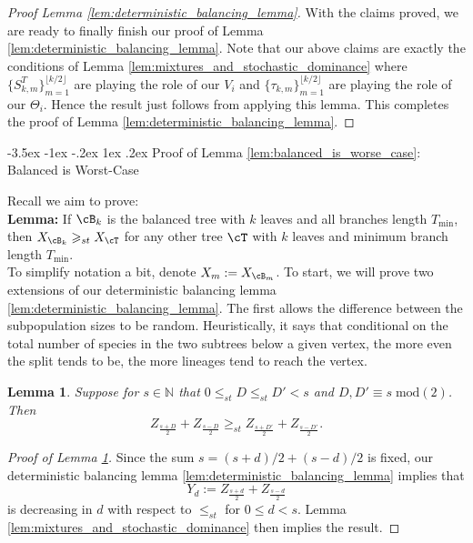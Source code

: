 \documentclass[10pt,oneside,reqno]{article}
\makeatletter
\theoremstyle{plain}
\newtheorem{lemma}[theorem]{Lemma}
\theoremstyle{definition}
\numberwithin{equation}{section}
\def\subsection#1{\@startsection {subsection}{2}{0pt}%
{-3.5ex \@plus -1ex \@minus -.2ex}%
{1ex \@plus.2ex}%
{\bf\mathversion{bold}}{#1}}
\renewcommand{\leq}{\leqslant}
\renewcommand{\geq}{\geqslant}
\newcommand{\N}{\mathbb{N}}
\makeatother
\begin{document}
\begin{proof}[Proof Lemma \ref{lem:deterministic_balancing_lemma}]
  \noindent With the claims proved, we are ready to finally finish our proof of Lemma \ref{lem:deterministic_balancing_lemma}. Note that our above claims are exactly the conditions of Lemma \ref{lem:mixtures_and_stochastic_dominance} where $\{S_{k,m}^T\}_{m=1}^{\lfloor k/2\rfloor}$ are playing the role of our $V_i$ and $\{\tau_{k,m}\}_{m=1}^{\lfloor k/2\rfloor}$ are playing the role of our $\Theta_i$. Hence the result just follows from applying this lemma. This completes the proof of Lemma \ref{lem:deterministic_balancing_lemma}.

\end{proof}

\subsection{Proof of Lemma \ref{lem:balanced_is_worse_case}: Balanced is Worst-Case}
\label{app:balanced-worst-case-proof}

Recall we aim to prove:\\

\noindent \textbf{Lemma:} If $\cB_k$ is the balanced tree with $k$ leaves and all branches length $T_{\mathrm{min}}$, then $X_{\cB_k} \geq_{st} X_\cT$ for any other tree $\cT$ with $k$ leaves and minimum branch length $T_{\mathrm{min}}$.\\

\noindent To simplify notation a bit, denote $X_m := X_{\cB_m}$.  To start, we will prove two extensions of our deterministic balancing lemma \ref{lem:deterministic_balancing_lemma}. The first allows the difference between the subpopulation sizes to be random. Heuristically, it  says that conditional on the total number of species in the two subtrees below a given vertex, the more even the split tends to be, the more lineages tend to reach the vertex.
\begin{lemma}
    Suppose for $s \in \N$ that $0 \leq_{st} D \leq_{st} D' < s$ and $D,D' \equiv s \; \mathrm{mod}(2)$. Then
    \[Z_{\frac{s + D}{2}} + Z_{\frac{s - D}{2}} \geq_{st} Z_{\frac{s + D'}{2}} + Z_{\frac{s - D'}{2}}.\]  
\label{lem:stochastic_dominance_with_differences}
\end{lemma}
%
\begin{proof}[Proof of Lemma \ref{lem:stochastic_dominance_with_differences}]
    Since the sum $s = (s+d)/2 + (s-d)/2$ is fixed, our deterministic balancing lemma \ref{lem:deterministic_balancing_lemma} implies that
    \[Y_d := Z_{\frac{s+d}{2}} + Z_{\frac{s-d}{2}}\]
    \noindent is decreasing in $d$ with respect to $\leq_{st}$ for $0 \leq d < s$. Lemma \ref{lem:mixtures_and_stochastic_dominance} then implies the result. 
\end{proof}
\end{document}
